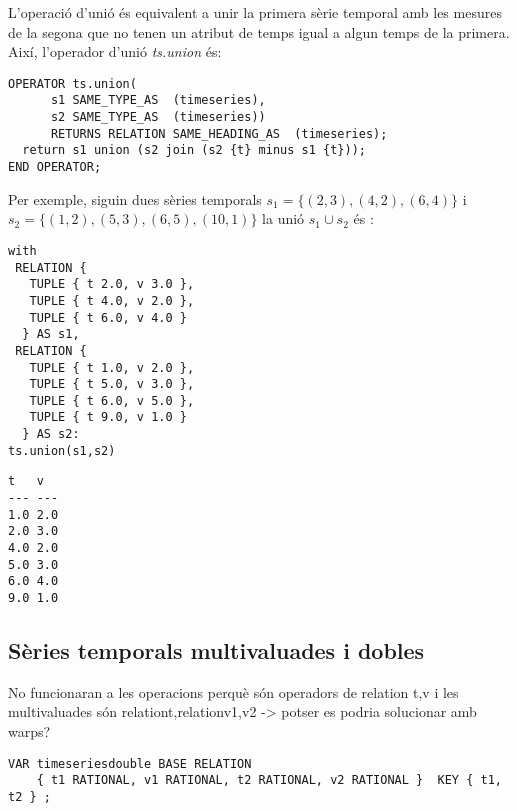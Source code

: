 L'operació d'unió és equivalent a unir la primera sèrie temporal amb
les mesures de la segona que no tenen un atribut de temps igual a
algun temps de la primera. Així, l'operador d'unió \emph{ts.union}
 és:
\begin{lstlisting}[style=tutorialD]
OPERATOR ts.union(
      s1 SAME_TYPE_AS  (timeseries), 
      s2 SAME_TYPE_AS  (timeseries)) 
      RETURNS RELATION SAME_HEADING_AS  (timeseries);
  return s1 union (s2 join (s2 {t} minus s1 {t}));
END OPERATOR;
\end{lstlisting}

Per exemple, siguin dues sèries temporals $s_1=\{(2,3),(4,2),(6,4)\}$ i $s_2=\{(1,2),(5,3),(6,5),(10,1)\}$ la unió $s_1\cup s_2$ és :
\begin{lstlisting}[style=tutorialD]
with 
 RELATION {
   TUPLE { t 2.0, v 3.0 },
   TUPLE { t 4.0, v 2.0 },
   TUPLE { t 6.0, v 4.0 }
  } AS s1,
 RELATION {
   TUPLE { t 1.0, v 2.0 },
   TUPLE { t 5.0, v 3.0 },
   TUPLE { t 6.0, v 5.0 },
   TUPLE { t 9.0, v 1.0 }
  } AS s2: 
ts.union(s1,s2)
\end{lstlisting}
\begin{lstlisting}[style=stdout]
 t   v 
--- ---
1.0 2.0
2.0 3.0
4.0 2.0
5.0 3.0
6.0 4.0
9.0 1.0
\end{lstlisting}




%

\subsection{Sèries temporals multivaluades i dobles}


\todo{}

No funcionaran a les operacions perquè són operadors de relation {t,v} i les multivaluades són relation{t,relation{v1,v2}} -> potser es podria solucionar amb warps?


\begin{lstlisting}[style=tutorialD]
VAR timeseriesdouble BASE RELATION
    { t1 RATIONAL, v1 RATIONAL, t2 RATIONAL, v2 RATIONAL }  KEY { t1, t2 } ;
\end{lstlisting}








